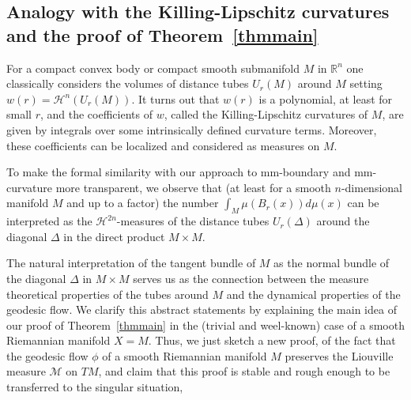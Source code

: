 \documentclass[12pt,leqno]{amsart}
\numberwithin{equation}{section}
\theoremstyle{definition}
\theoremstyle{remark}
\newcommand{\tref}[1]{Theorem~\ref{#1}}
\newcommand{\R}{\mathbb{R}}
\begin{document}
\subsection{Analogy with the Killing-Lipschitz curvatures and the proof of \tref{thmmain}}
For a compact convex body or compact smooth submanifold $M$ in $\R^n$ one classically considers
the  volumes of distance tubes $U_r(M)$ around $M$ setting $w(r)=\mathcal H^n (U_r(M))$.
It turns out that $w(r)$ is a polynomial, at least for small $r$, and  the coefficients of
$w$, called the   Killing-Lipschitz curvatures of $M$, are given by  integrals over some intrinsically defined curvature
 terms.  Moreover, these coefficients can be localized and considered as measures on $M$.

To make the formal similarity with our approach  to mm-boundary and mm-curvature more transparent, we observe that
(at least for a smooth $n$-dimensional manifold $M$ and up to a factor) the number   $\int _M \mu (B_r(x)) d\mu (x)$  can be interpreted as the $\mathcal H^{2n}$-measures
of the distance tubes $U_r(\Delta )$ around the diagonal $\Delta $ in the direct product $M\times M$.


The natural interpretation of the tangent bundle of $M$ as the normal  bundle of the diagonal $\Delta$ in $M\times M$ serves us as the connection between
the measure theoretical properties of the tubes around $M$ and the dynamical properties of the geodesic flow.
We clarify this abstract statements by explaining the main idea of  our  proof of \tref{thmmain} in the (trivial and weel-known) case of a smooth Riemannian manifold $X=M$. Thus, we just sketch a new proof,  of the fact   that the geodesic flow $\phi$ of a smooth Riemannian manifold $M$ preserves the Liouville measure $\mathcal M$ on $TM$, and claim that this proof is stable and rough enough to be transferred to the singular situation,
\end{document}
